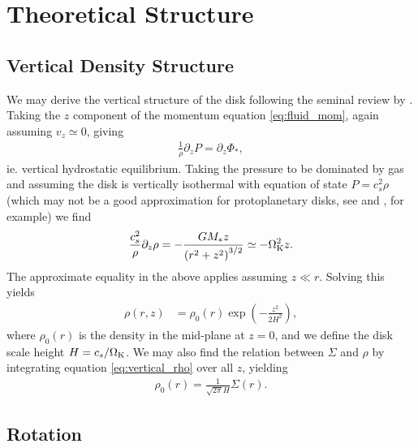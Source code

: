 \section{Theoretical Structure}


\subsection{Vertical Density Structure}

We may derive the vertical structure of the disk following the seminal review by \citet{pringle1981}. Taking the $z$ component of the momentum equation \ref{eq:fluid_mom}, again assuming $v_z \simeq 0$, giving
\begin{align}
    \frac{1}{\rho} \partial_z P = \partial_z \Phi_*,
\end{align}
ie. vertical hydrostatic equilibrium. 
Taking the pressure to be dominated by gas and assuming the disk is vertically isothermal with equation of state $P=c_s^2 \rho$ (which may not be a good approximation for protoplanetary disks, see \citet{pinte2018} and \citet{calahan2021}, for example) we find
\begin{align}
    \frac{c_s^2}{\rho} \partial_z \rho = - \frac{G M_* z}{\left(r^2 + z^2\right)^{3/2}} \simeq - \Omega_{\rm K}^2 z.
\end{align}
The approximate equality in the above applies assuming $z \ll r$. 
Solving this yields
\begin{align}
    \rho(r,z) &= \rho_0(r) \exp{\left( -\frac{z^2}{2 H^2} \right)}, \label{eq:vertical_rho}
\end{align}
where $\rho_0(r)$ is the density in the mid-plane at $z=0$, and we define the disk scale height $H = c_s/\Omega_{\rm K}$.
We may also find the relation between $\Sigma$ and $\rho$ by integrating equation \ref{eq:vertical_rho} over all $z$, yielding
\begin{align}
    \rho_0(r) = \frac{1}{\sqrt{2\pi} H} \Sigma(r).
\end{align}

\subsection{Rotation}

